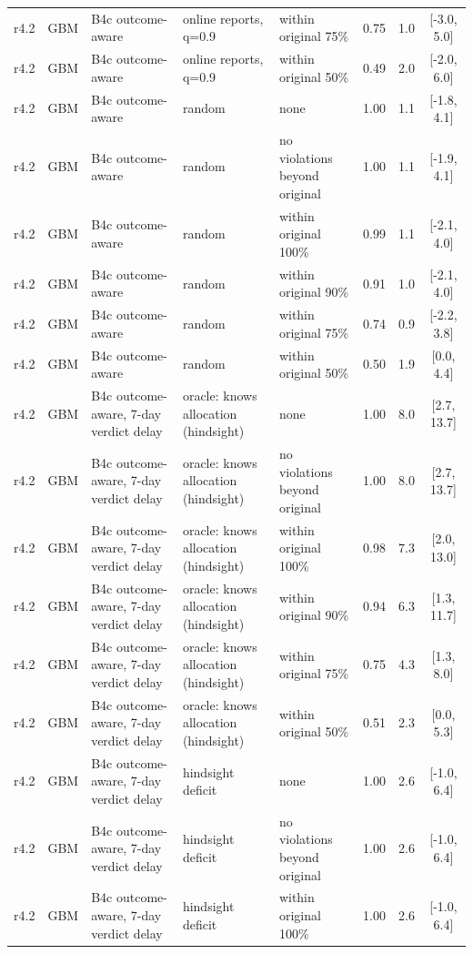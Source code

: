 \documentclass[10pt,onecolumn,letterpaper]{article}
\begin{document}
\begin{longtable}{lllp{4.2cm}p{3.4cm}ccc}
r4.2 & GBM & B4c outcome-aware & online reports, q=0.9 & within original 75\% & 0.75 & 1.0 & [-3.0, 5.0] \\
r4.2 & GBM & B4c outcome-aware & online reports, q=0.9 & within original 50\% & 0.49 & 2.0 & [-2.0, 6.0] \\
r4.2 & GBM & B4c outcome-aware & random & none & 1.00 & 1.1 & [-1.8, 4.1] \\
r4.2 & GBM & B4c outcome-aware & random & no violations beyond original & 1.00 & 1.1 & [-1.9, 4.1] \\
r4.2 & GBM & B4c outcome-aware & random & within original 100\% & 0.99 & 1.1 & [-2.1, 4.0] \\
r4.2 & GBM & B4c outcome-aware & random & within original 90\% & 0.91 & 1.0 & [-2.1, 4.0] \\
r4.2 & GBM & B4c outcome-aware & random & within original 75\% & 0.74 & 0.9 & [-2.2, 3.8] \\
r4.2 & GBM & B4c outcome-aware & random & within original 50\% & 0.50 & 1.9 & [0.0, 4.4] \\
r4.2 & GBM & B4c outcome-aware, 7-day verdict delay & oracle: knows allocation (hindsight) & none & 1.00 & 8.0 & [2.7, 13.7] \\
r4.2 & GBM & B4c outcome-aware, 7-day verdict delay & oracle: knows allocation (hindsight) & no violations beyond original & 1.00 & 8.0 & [2.7, 13.7] \\
r4.2 & GBM & B4c outcome-aware, 7-day verdict delay & oracle: knows allocation (hindsight) & within original 100\% & 0.98 & 7.3 & [2.0, 13.0] \\
r4.2 & GBM & B4c outcome-aware, 7-day verdict delay & oracle: knows allocation (hindsight) & within original 90\% & 0.94 & 6.3 & [1.3, 11.7] \\
r4.2 & GBM & B4c outcome-aware, 7-day verdict delay & oracle: knows allocation (hindsight) & within original 75\% & 0.75 & 4.3 & [1.3, 8.0] \\
r4.2 & GBM & B4c outcome-aware, 7-day verdict delay & oracle: knows allocation (hindsight) & within original 50\% & 0.51 & 2.3 & [0.0, 5.3] \\
r4.2 & GBM & B4c outcome-aware, 7-day verdict delay & hindsight deficit & none & 1.00 & 2.6 & [-1.0, 6.4] \\
r4.2 & GBM & B4c outcome-aware, 7-day verdict delay & hindsight deficit & no violations beyond original & 1.00 & 2.6 & [-1.0, 6.4] \\
r4.2 & GBM & B4c outcome-aware, 7-day verdict delay & hindsight deficit & within original 100\% & 1.00 & 2.6 & [-1.0, 6.4] \\

\end{longtable}
\end{document}
